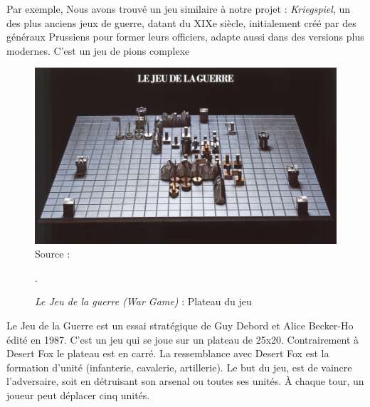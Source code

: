 Par exemple, Nous avons trouvé un jeu similaire à notre projet : \textit{Kriegspiel}, un des plus anciens jeux de guerre, datant du XIXe siècle, initialement créé par des généraux Prussiens pour former leurs officiers, adapte aussi dans des versions plus modernes.
C'est un jeu de pions complexe   \cite{livermore1879american}
\begin{figure}[H]
    \centering
    \includegraphics[scale=0.2]{data/Cavalry_at_dusk.jpg}\\

    Source : 
    \caption{\textit{Le Jeu de la guerre (War Game)} : Plateau du jeu}.

\end{figure}

Le Jeu de la Guerre \cite{frwiki:189457170} est un essai stratégique de Guy Debord et Alice Becker-Ho édité en 1987.
C'est un jeu qui se joue sur un plateau de 25x20. Contrairement à Desert Fox le plateau est en carré. La ressemblance avec Desert Fox est la formation d'unité (infanterie, cavalerie, artillerie).
Le but du jeu, est de vaincre l'adversaire, soit en détruisant son arsenal ou toutes ses unités. À chaque tour, un joueur peut déplacer cinq unités.


